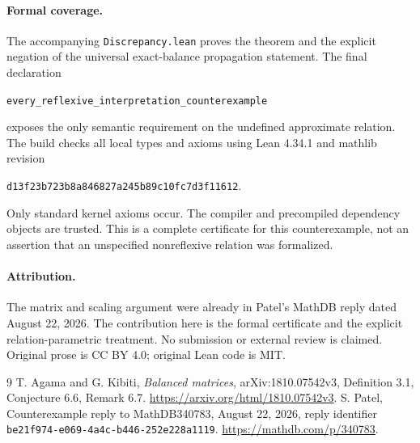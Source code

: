 \documentclass[11pt]{article}
\begin{document}
\paragraph{Formal coverage.}
The accompanying \texttt{Discrepancy.lean} proves the theorem and the
explicit negation of the universal exact-balance propagation statement.
The final declaration \begin{center}\small\texttt{every\_reflexive\_interpretation\_counterexample}\end{center}
exposes the only semantic requirement on the undefined approximate relation.
The build checks all local types and axioms using Lean 4.34.1 and mathlib
revision \begin{center}\small\texttt{d13f23b723b8a846827a245b89c10fc7d3f11612}.\end{center}
Only standard kernel axioms occur. The compiler and precompiled dependency
objects are trusted. This is a complete certificate for this counterexample,
not an assertion that an unspecified nonreflexive relation was formalized.
\paragraph{Attribution.}
The matrix and scaling argument were already in Patel's MathDB reply dated
August 22, 2026. The contribution here is the formal certificate and the
explicit relation-parametric treatment. No submission or external review is
claimed. Original prose is CC BY 4.0; original Lean code is MIT.
\begin{thebibliography}{9}
 T. Agama and G. Kibiti,
\emph{Balanced matrices}, arXiv:1810.07542v3, Definition 3.1,
Conjecture 6.6, Remark 6.7.
\url{https://arxiv.org/html/1810.07542v3}.
 S. Patel, Counterexample reply to MathDB340783,
August 22, 2026, reply identifier
\texttt{be21f974-e069-4a4c-b446-252e228a1119}.
\url{https://mathdb.com/p/340783}.
\end{thebibliography}
\end{document}
